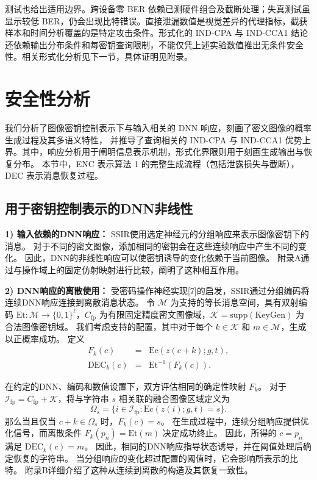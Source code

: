 测试也给出适用边界。跨设备零 BER 依赖已测硬件组合及截断处理；失真测试虽显示较低 BER，仍会出现比特错误。直接泄漏数值是视觉差异的代理指标，截获样本和时间分析覆盖的是特定攻击条件。形式化的 IND-CPA 与 IND-CCA1 结论还依赖输出分布条件和每密钥查询限制，不能仅凭上述实验数值推出无条件安全性。相关形式化分析见下一节，具体证明见附录。
\section{安全性分析}
我们分析了图像密钥控制表示下与输入相关的 DNN 响应，刻画了密文图像的概率生成过程及其多语义特性，
并推导了查询相关的 IND-CPA 与 IND-CCA1 优势上界。其中，响应分析用于阐明信息表示机制，形式化界限则用于刻画生成输出与恢复分布。
本节中，ENC 表示算法 1 的完整生成流程（包括泄露损失与截断），DEC 表示消息恢复过程。
\subsection{用于密钥控制表示的DNN非线性}
\textbf{1) 输入依赖的DNN响应：}
SSIR使用选定神经元的分组响应来表示图像密钥下的消息。
对于不同的密文图像，添加相同的密钥会在这些连续响应中产生不同的变化。
因此，DNN的非线性响应可以使密钥诱导的变化依赖于当前图像。
附录A通过与操作域上的固定仿射映射进行比较，阐明了这种相互作用。

\textbf{2) DNN响应的离散使用：}
受密码操作神经实现[7]的启发，SSIR通过分组编码将连续DNN响应连接到离散消息状态。
令 \(\mathcal{M}\) 为支持的等长消息空间，具有双射编码 \(\mathrm{Et} : \mathcal{M} \to \{0,1\}^\ell\)，\(C_{\mathrm{fp}}\) 为有限固定精度密文图像域，\(\mathcal{K} = \mathrm{supp}(\mathrm{KeyGen})\) 为合法图像密钥域。
我们考虑支持的配置，其中对于每个 \(k \in \mathcal{K}\) 和 \(m \in \mathcal{M}\)，生成以正概率成功。
定义
\begin{equation}
\begin{array}{rcl}
F_k(c) &=& \mathrm{Ec}(z(c+k); g, t), \\
\mathrm{DEC}_k(c) &=& \mathrm{Et}^{-1}(F_k(c)).
\end{array}
\end{equation}

在约定的DNN、编码和数值设置下，双方评估相同的确定性映射 \(F_k\)。
对于 \(\mathcal{I}_{\mathrm{fp}} = C_{\mathrm{fp}} + \mathcal{K}\)，将与字符串 \(s\) 相关联的融合图像区域定义为
\begin{equation}
\Omega_s = \{ i \in \mathcal{I}_{\mathrm{fp}} : \mathrm{Ec}(z(i); g, t) = s \}.
\end{equation}
那么当且仅当 \(c + k \in \Omega_s\) 时，\(F_k(c) = s\)。
在生成过程中，连续分组响应提供优化信号，而离散条件 \(F_k(p_n) = \mathrm{Et}(m)\) 决定成功终止。
因此，所得的 \(c = p_n\) 满足 \(\mathrm{DEC}_k(c) = m\)。
因此，相同的DNN响应指导状态诱导，并在阈值处理后确定恢复的字符串。
当分组响应的变化超过配置的阈值时，它会影响所表示的比特。
附录B详细介绍了这种从连续到离散的构造及其恢复一致性。

